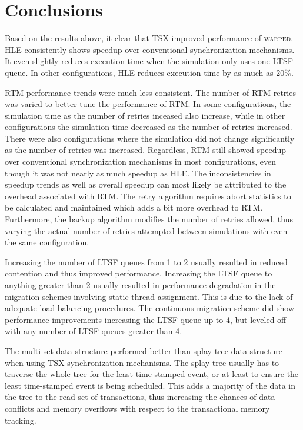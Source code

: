 \documentclass[11pt]{book}
\begin{document}
\section{Conclusions}

Based on the results above, it clear that TSX improved performance of \textsc{warped}.
HLE consistently shows speedup over conventional synchronization mechanisms.  It even
slightly reduces execution time when the simulation only uses one LTSF queue.  In other
configurations, HLE reduces execution time by as much as 20\%.

RTM performance trends were much less consistent.  The number of RTM retries was varied to
better tune the performance of RTM.  In some configurations, the simulation time as the
number of retries inceased also increase, while in other configurations the simulation
time decreased as the number of retries increased.  There were also configurations where
the simulation did not change significantly as the number of retries was increased.
Regardless, RTM still showed speedup over conventional synchronization mechanisms in most
configurations, even though it was not nearly as much speedup as HLE.  The inconsistencies
in speedup trends as well as overall speedup can most likely be attributed to the overhead
associated with RTM.  The retry algorithm requires abort statistics to be calculated and
maintained which adds a bit more overhead to RTM.  Furthermore, the backup algorithm
modifies the number of retries allowed, thus varying the actual number of retries
attempted between simulations with even the same configuration.

Increasing the number of LTSF queues from 1 to 2 usually resulted in reduced contention
and thus improved performance.  Increasing the LTSF queue to anything greater than 2
usually resulted in performance degradation in the migration schemes involving static
thread assignment.  This is due to the lack of adequate load balancing procedures.  The
continuous migration scheme did show performance improvements increasing the LTSF queue up
to 4, but leveled off with any number of LTSF queues greater than 4.

The multi-set data structure performed better than splay tree data structure when using
TSX synchronization mechanisms.  The splay tree usually has to traverse the whole tree for
the least time-stamped event, or at least to ensure the least time-stamped event is being
scheduled.  This adds a majority of the data in the tree to the read-set of transactions,
thus increasing the chances of data conflicts and memory overflows with respect to the
transactional memory tracking.
\end{document}
